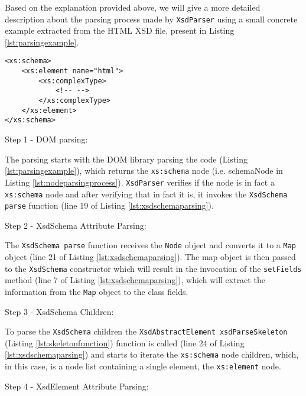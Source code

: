\noindent
Based on the explanation provided above, we will give a more detailed description about the parsing process made by \texttt{XsdParser} using a small concrete example extracted from the \ac{HTML} \ac{XSD} file, present in Listing \ref{lst:parsingexample}.

\bigskip


\begin{minipage}{\linewidth}
\begin{lstlisting}[caption={Parsing Concrete Example},captionpos=b,label={lst:parsingexample}]
<xs:schema>
    <xs:element name="html">
        <xs:complexType>
            <!-- -->
        </xs:complexType>
    </xs:element>
</xs:schema>
\end{lstlisting}
\end{minipage}


Step 1 - DOM parsing:

\noindent
The parsing starts with the \ac{DOM} library parsing the code (Listing \ref{lst:parsingexample}), which returns the \texttt{xs:schema} node (i.e. schemaNode in Listing \ref{lst:nodeparsingprocess}). \texttt{XsdParser} verifies if the node is in fact a \texttt{xs:schema} node and after verifying that in fact it is, it invokes the \texttt{XsdSchema parse} function (line 19 of Listing \ref{lst:xsdschemaparsing}). 

Step 2 - XsdSchema Attribute Parsing:

\noindent
The \texttt{XsdSchema parse} function receives the \texttt{Node} object and converts it to a \texttt{Map} object (line 21 of Listing \ref{lst:xsdschemaparsing}). The map object is then passed to the \texttt{XsdSchema} constructor which will result in the invocation of the \texttt{setFields} method (line 7 of Listing \ref{lst:xsdschemaparsing}), which will extract the information from the \texttt{Map} object to the class fields.

Step 3 - XsdSchema Children:

\noindent
To parse the \texttt{XsdSchema} children the \texttt{XsdAbstractElement xsdParseSkeleton} (Listing \ref{lst:skeletonfunction}) function is called (line 24 of Listing \ref{lst:xsdschemaparsing}) and starts to iterate the \texttt{xs:schema} node children, which, in this case, is a node list containing a single element, the \texttt{xs:element} node. 

Step 4 - XsdElement Attribute Parsing:


